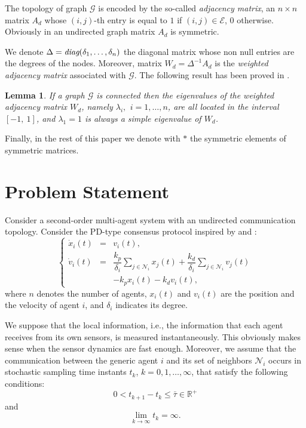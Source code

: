 \documentclass[conference]{IEEEtran}
\newtheorem{lemma}[theorem]{\textbf{Lemma}}
\begin{document}
The topology of graph $\mathcal{G}$ is encoded by the so-called {\em adjacency matrix}, an $n \times n$ matrix $A_d$ whose $(i,j)$-th entry is equal to $1$ if $(i,j)\in \mathcal{E}$, $0$ otherwise. Obviously in an undirected graph matrix $A_d$ is symmetric.

We denote $\Delta=\emph{diag}(\delta_{1}, \ldots,\delta_{n})$ the diagonal matrix whose non null entries are the degrees of the nodes. Moreover, matrix $W_d=\Delta^{-1} A_d$ is the {\em weighted adjacency matrix} associated with $\mathcal{G}$.
The following result has been proved in \cite{ETFA2014}.

\begin{lemma}\label{lemma_connected}
If a graph $\mathcal{G}$ is connected then the eigenvalues of the weighted adjacency matrix $W_d$, namely $\lambda_i, \ \, i=1,\ldots,n$, are all located in the interval $[-1, \ 1]$, and $\lambda_1=1$ is always a simple eigenvalue of $W_d$.
\end{lemma}



Finally, in the rest of this paper we denote with $*$ the symmetric elements of symmetric matrices.


\section{Problem Statement}\label{ProblemState}

Consider a second-order multi-agent system with an undirected communication topology. Consider the PD-type consensus protocol inspired by  \cite{cepeda2011exact} and \cite{Zareh_consensus}:
\begin{equation}\label{maineq_not_sampled}
\left\{
\begin{array}{lll}
 \dot{x}_i(t) & = & v_i(t),
\\
\dot{v}_i(t)& = & \dfrac{k_p}{\delta_i}\sum_{j \in \mathcal{N}_i}x_j(t)+\dfrac{k_d}{\delta_i}\sum_{j \in \mathcal{N}_i}v_j(t) \\
 & & -k_p x_i(t)-k_d v_i(t),
\end{array}
\right.
\end{equation}
where $n$ denotes the number of agents, $x_i(t)$ and $v_i(t)$ are the position and the velocity of agent $i$, and $\delta_i$ indicates its degree.



We suppose that the local information, i.e., the information that each agent receives from its own sensors, is measured instantaneously. This obviously makes sense when the sensor dynamics are fast enough. 
Moreover, we assume that the communication between the generic agent $i$ and its set of neighbors $\mathcal{N}_i$ occurs in stochastic sampling time instants $t_k$, $k=0,1,\ldots, \infty$, that satisfy the following conditions: $$0  < t_{k+1}-t_k\leq \bar{\tau}\in \mathbb{R}^+$$ and $$\lim\limits_{k\to \infty}t_k=\infty.$$
\end{document}
